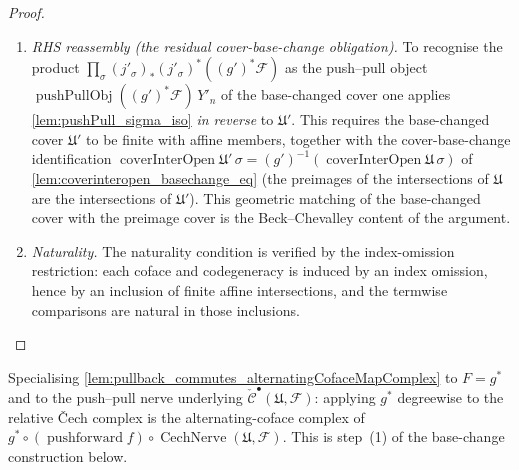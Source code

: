 \begin{proof}
\begin{enumerate}
    \item \emph{RHS reassembly (the residual cover-base-change obligation).} To recognise the
      product \(\prod_\sigma (j'_\sigma)_*(j'_\sigma)^*((g')^*\mathcal{F})\) as the push--pull
      object \(\operatorname{pushPullObj}((g')^*\mathcal{F})\, Y'_n\) of the base-changed cover
      one applies \cref{lem:pushPull_sigma_iso} \emph{in reverse} to \(\mathfrak{U}'\). This
      requires the base-changed cover \(\mathfrak{U}'\) to be finite with affine members,
      together with the cover-base-change identification
      \(\operatorname{coverInterOpen}\mathfrak{U}'\,\sigma = (g')^{-1}
      (\operatorname{coverInterOpen}\mathfrak{U}\,\sigma)\) of
      \cref{lem:coverinteropen_basechange_eq} (the preimages of the intersections
      of \(\mathfrak{U}\) are the intersections of \(\mathfrak{U}'\)). This geometric matching
      of the base-changed cover with the preimage cover is the Beck--Chevalley content of the
      argument.
    \item \emph{Naturality.} The naturality condition is verified by the index-omission
      restriction: each coface and codegeneracy is induced by an index omission, hence by
      an inclusion of finite affine intersections, and the termwise comparisons are natural
      in those inclusions.
  \end{enumerate}
\end{proof}

\begin{definition}\leanok
  \label{def:pullback_cechComplex_alternatingIso}
  Specialising \cref{lem:pullback_commutes_alternatingCofaceMapComplex} to \(F = g^*\)
  and to the push--pull nerve underlying \(\check{\mathcal{C}}^\bullet(\mathfrak{U},
  \mathcal{F})\): applying \(g^*\) degreewise to the relative {\v C}ech complex is the
  alternating-coface complex of \(g^* \circ (\operatorname{pushforward} f) \circ
  \operatorname{CechNerve}(\mathfrak{U}, \mathcal{F})\). This is step~(1) of the
  base-change construction below.
\end{definition}

